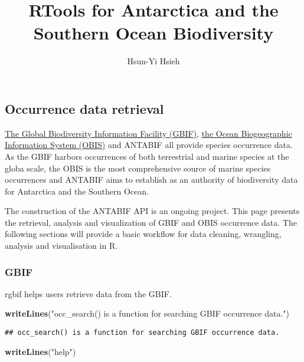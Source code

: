 \documentclass[]{article}
\title{RTools for Antarctica and the Southern Ocean Biodiversity}
\author{Hsun-Yi Hsieh}
\date{}
\newenvironment{Shaded}{\begin{snugshade}}{\end{snugshade}}
\newcommand{\KeywordTok}[1]{\textcolor[rgb]{0.13,0.29,0.53}{\textbf{#1}}}
\newcommand{\StringTok}[1]{\textcolor[rgb]{0.31,0.60,0.02}{#1}}
\newcommand{\NormalTok}[1]{#1}
\begin{document}
\maketitle

\subsection{Occurrence data retrieval}\label{occurrence-data-retrieval}

\href{https://www.gbif.org/}{The Global Biodiversity Information
Facility (GBIF)}, \href{http://www.iobis.org/}{the Ocean Biogeographic
Information System (OBIS)} and ANTABIF all provide species occurrence
data. As the GBIF harbors occurrences of both terrestrial and marine
species at the globa scale, the OBIS is the most comprehensive source of
marine species occurrences and ANTABIF aims to establish as an authority
of biodiversity data for Antarctica and the Southern Ocean.

The construction of the ANTABIF API is an ongoing project. This page
presents the retrieval, analysis and visualization of GBIF and OBIS
occurrence data. The following sections will provide a basic workflow
for data cleaning, wrangling, analysis and visualisation in R.

\subsubsection{GBIF}\label{gbif}

rgbif helps users retrieve data from the GBIF.

\begin{Shaded}
\begin{Highlighting}[]
\KeywordTok{writeLines}\NormalTok{(}\StringTok{"occ_search() is a function for searching GBIF occurrence data."}\NormalTok{)}
\end{Highlighting}
\end{Shaded}

\begin{verbatim}
## occ_search() is a function for searching GBIF occurrence data.
\end{verbatim}


\color{red}

\begin{Shaded}
\begin{Highlighting}[]
\KeywordTok{writeLines}\NormalTok{(}\StringTok{"help"}\NormalTok{)}
\end{Highlighting}
\end{Shaded}
\end{document}
